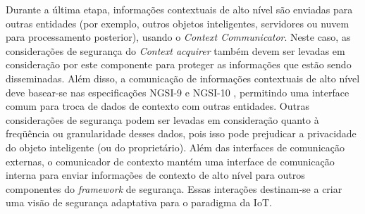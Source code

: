 \documentclass[tid,table]{texufpel} %
\begin{document}
Durante a última etapa, informações contextuais de alto nível são enviadas para outras entidades (por exemplo, outros objetos inteligentes, servidores ou nuvem para processamento posterior), usando o \textit{Context Communicator}. Neste caso, as considerações de segurança do \textit{Context acquirer} também devem ser levadas em consideração por este componente para proteger as informações que estão sendo disseminadas. Além disso, a comunicação de informações contextuais de alto nível deve basear-se nas especificações NGSI-9 e NGSI-10 \cite{oma12}, permitindo uma interface comum para troca de dados de contexto com outras entidades. Outras considerações de segurança podem ser levadas em consideração quanto à freqüência ou granularidade desses dados, pois isso pode prejudicar a privacidade do objeto inteligente (ou do proprietário). Além das interfaces de comunicação externas, o comunicador de contexto mantém uma interface de comunicação interna para enviar informações de contexto de alto nível para outros componentes do \textit{framework} de segurança. Essas interações destinam-se a criar uma visão de segurança adaptativa para o paradigma da IoT.

\end{document}

